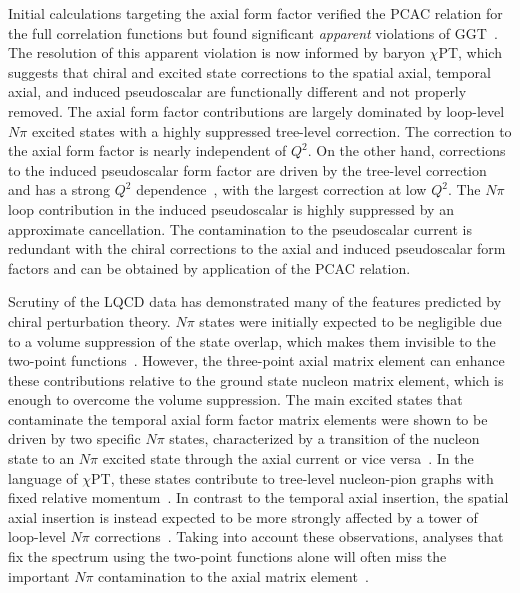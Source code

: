 \documentclass{ar-1col}
\begin{document}
Initial calculations targeting the axial form factor verified the PCAC relation
 for the full correlation functions but found significant \emph{apparent} violations
 of GGT~\cite{Ishikawa:2018rew,Gupta:2017dwj,Bali:2018qus}. The resolution of this apparent violation
 is now informed by baryon $\chi$PT, which suggests that chiral
 and excited state corrections to the spatial axial, temporal axial, and induced pseudoscalar
 are functionally different and not properly removed.
The axial form factor contributions are largely dominated by loop-level $N\pi$ excited states
 with a highly suppressed tree-level correction.
The correction to the axial form factor is nearly independent of $Q^2$.
On the other hand, corrections to the induced pseudoscalar form factor are
 driven by the tree-level correction and has
 a strong $Q^2$ dependence~\cite{Bar:2018xyi}, with the largest correction at low $Q^2$.
The $N\pi$ loop contribution in the induced pseudoscalar is highly suppressed by
 an approximate cancellation.
The contamination to the pseudoscalar current is redundant with the
 chiral corrections to the axial and induced pseudoscalar form factors and can be obtained
 by application of the PCAC relation.

Scrutiny of the LQCD data has demonstrated many of the features
 predicted by chiral perturbation theory.
$N\pi$ states were initially expected to be negligible due to a volume suppression
 of the state overlap, which makes them invisible to the two-point functions~\cite{Bar:2016uoj}.
However, the three-point axial matrix element can enhance these contributions relative
 to the ground state nucleon matrix element, which is enough to overcome the volume suppression.
The main excited states that contaminate the temporal axial form factor matrix elements
 were shown to be driven by two specific $N\pi$ states,
 characterized by a transition
 of the nucleon state to an $N\pi$ excited state through the axial current or vice versa~\cite{Jang:2019vkm}.
In the language of $\chi$PT, these states contribute to tree-level nucleon-pion graphs with fixed relative momentum~\cite{Bar:2018xyi}.
In contrast to the temporal axial insertion, the spatial axial insertion
 is instead expected to be more strongly affected by a tower of loop-level
 $N\pi$ corrections~\cite{Bar:2018xyi}.
Taking into account these observations,
 analyses that fix the spectrum using the two-point functions alone
 will often miss the important $N\pi$ contamination to the
 axial matrix element~\cite{Jang:2019vkm,He:2021yvm}.
\end{document}
